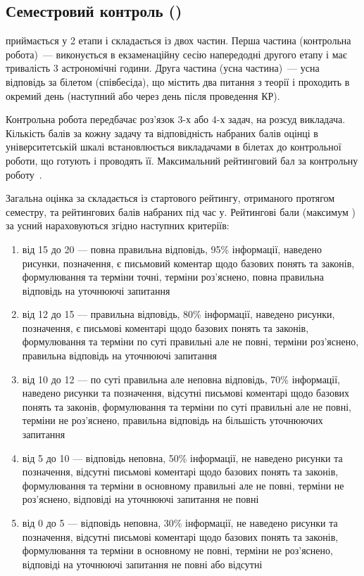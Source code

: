 \documentclass{Syllabus}
\begin{document}
\subsection*{Семестровий контроль (\control)}

\pgfmathsetmacro{\controlBal}{\controlBalPysm + \controlBalUsno}

\Control{} приймається у 2 етапи і складається із двох частин. Перша частина (контрольна робота)~--- виконується в екзаменаційну сесію напередодні другого етапу і має тривалість $3$ астрономічні години. Друга частина (усна частина)~--- усна відповідь за білетом (співбесіда), що містить два питання з теорії і проходить в окремий день (наступний або через день після проведення КР).

Контрольна робота передбачає роз'язок $3$-х або $4$-х задач, на розсуд викладача. Кількість балів за кожну задачу та відповідність набраних балів оцінці в університетській шкалі встановлюється викладачами в білетах до контрольної роботи, що готують і проводять її. Максимальний рейтинговий бал за контрольну роботу~\controlBalPysm.

Загальна оцінка за \control{} складається із стартового рейтингу, отриманого протягом семестру, та рейтингових балів набраних під час \control у. Рейтингові бали (максимум \controlBalUsno) за усний \control{} нараховуються згідно наступних критеріїв:
\begin{enumerate}[label=$\bullet$]
    \item від 15 до 20 --- повна правильна відповідь, 95\% інформації, наведено рисунки, позначення, є письмовий коментар щодо базових понять та законів, формулювання та терміни точні, терміни роз’яснено, повна правильна відповідь на уточнюючі запитання
    \item від 12 до 15 --- правильна відповідь, 80\% інформації, наведено рисунки, позначення, є письмові коментарі щодо базових понять та законів, формулювання та терміни по суті правильні але не повні, терміни роз’яснено, правильна відповідь на уточнюючі запитання
    \item від 10 до 12 --- по суті правильна але неповна відповідь, 70\% інформації, наведено рисунки та позначення, відсутні письмові коментарі щодо базових понять та законів, формулювання та терміни по суті правильні але не повні, терміни не роз’яснено, правильна відповідь на більшість уточнюючих запитання
    \item від 5 до 10 --- відповідь неповна, 50\% інформації, не наведено рисунки та позначення, відсутні письмові коментарі щодо базових понять та законів, формулювання та терміни в основному правильні але не повні, терміни не роз’яснено, відповіді на уточнюючі запитання не повні
    \item від 0 до 5 --- відповідь неповна, 30\% інформації, не наведено рисунки та позначення, відсутні письмові коментарі щодо базових понять та законів, формулювання та терміни в основному не повні, терміни не роз’яснено, відповіді на уточнюючі запитання не повні або відсутні
\end{enumerate}
\end{document}
